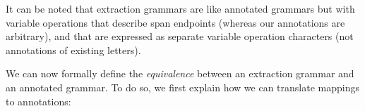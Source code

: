 %
%
%
%
%
%
%
%
%
%
%
%
%
%
%
%
%
%
%
%
%
%
%
%
%
%
%
%
%
%
%
%
%
%
%
%
%
%
%
%
%
%
%
%
%
%
%
%
%
%
%
%
%
%
%
%
%
%
%
%
%
%
%
%

It can be noted that extraction grammars are like annotated grammars but with variable
operations that
describe span endpoints
(whereas our annotations are arbitrary), and that are expressed as separate
variable operation characters (not annotations of existing letters).
%

We can now formally define the \emph{equivalence} between an extraction grammar
and an annotated grammar. To do so, we first explain how we can translate
mappings to annotations:

